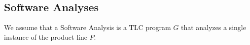 \documentclass[11pt]{article} %
\begin{document}



\subsection{Software Analyses}
We assume that a Software Analysis is a TLC program $G$ that analyzes a single instance of the product line $P$. 





\end{document}

